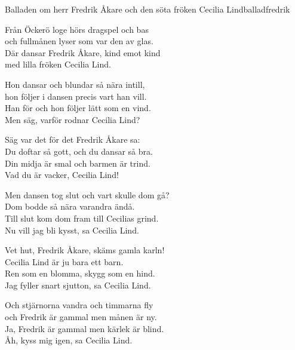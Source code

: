 \begin{song}{Balladen om herr Fredrik Åkare och den söta fröken Cecilia Lind}{balladfredrik}
\begin{vers}
Från Öckerö loge hörs dragspel och bas\\
och fullmånen lyser som var den av glas.\\
Där dansar Fredrik Åkare, kind emot kind\\
med lilla fröken Cecilia Lind.\\
\end{vers}
\begin{vers}
Hon dansar och blundar så nära intill,\\
hon följer i dansen precis vart han vill.\\
Han för och hon följer lätt som en vind.\\
Men säg, varför rodnar Cecilia Lind?\\
\end{vers}
\begin{vers}
Säg var det för det Fredrik Åkare sa:\\
Du doftar så gott, och du dansar så bra.\\
Din midja är smal och barmen är trind.\\
Vad du är vacker, Cecilia Lind!\\
\end{vers}
\begin{vers}
Men dansen tog slut och vart skulle dom gå?\\
Dom bodde så nära varandra ändå.\\
Till slut kom dom fram till Cecilias grind.\\
Nu vill jag bli kysst, sa Cecilia Lind.\\
\end{vers}

\newp

\begin{vers}
Vet hut, Fredrik Åkare, skäms gamla karln!\\
Cecilia Lind är ju bara ett barn.\\
Ren som en blomma, skygg som en hind.\\
Jag fyller snart sjutton, sa Cecilia Lind.\\
\end{vers}

\begin{vers}
Och stjärnorna vandra och timmarna fly\\
och Fredrik är gammal men månen är ny.\\
Ja, Fredrik är gammal men kärlek är blind.\\
Åh, kyss mig igen, sa Cecilia Lind. \\
\end{vers}
\end{song}
